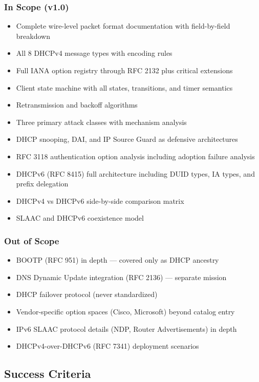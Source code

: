 \documentclass[11pt,letterpaper]{article}
\begin{document}
\subsubsection{In Scope (v1.0)}
\begin{itemize}[noitemsep]
  \item Complete wire-level packet format documentation with field-by-field breakdown
  \item All 8 DHCPv4 message types with encoding rules
  \item Full IANA option registry through RFC 2132 plus critical extensions
  \item Client state machine with all states, transitions, and timer semantics
  \item Retransmission and backoff algorithms
  \item Three primary attack classes with mechanism analysis
  \item DHCP snooping, DAI, and IP Source Guard as defensive architectures
  \item RFC 3118 authentication option analysis including adoption failure analysis
  \item DHCPv6 (RFC 8415) full architecture including DUID types, IA types, and prefix delegation
  \item DHCPv4 vs DHCPv6 side-by-side comparison matrix
  \item SLAAC and DHCPv6 coexistence model
\end{itemize}

\subsubsection{Out of Scope}
\begin{itemize}[noitemsep]
  \item BOOTP (RFC 951) in depth --- covered only as DHCP ancestry
  \item DNS Dynamic Update integration (RFC 2136) --- separate mission
  \item DHCP failover protocol (never standardized)
  \item Vendor-specific option spaces (Cisco, Microsoft) beyond catalog entry
  \item IPv6 SLAAC protocol details (NDP, Router Advertisements) in depth
  \item DHCPv4-over-DHCPv6 (RFC 7341) deployment scenarios
\end{itemize}

\subsection{Success Criteria}
\end{document}
